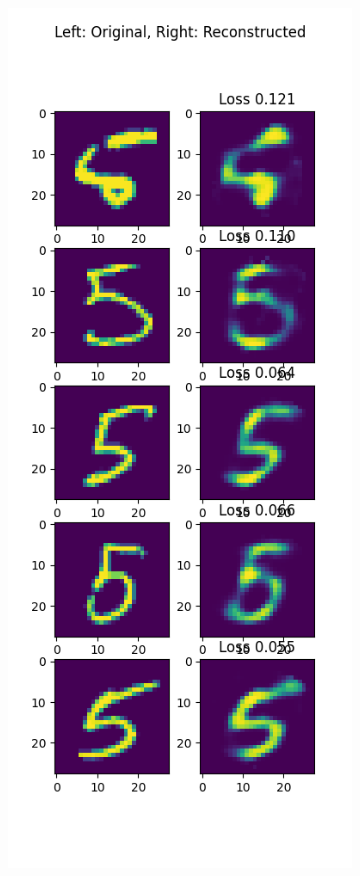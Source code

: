 \begin{solve}
\begin{figure}[H]
\begin{subfigure}{.5\textwidth}
    \end{subfigure}%
    \begin{subfigure}{.5\textwidth}
      \centering
      \includegraphics[width=.9\linewidth]{plots/output_5.png}

\end{subfigure}
\end{figure}
\end{solve}
